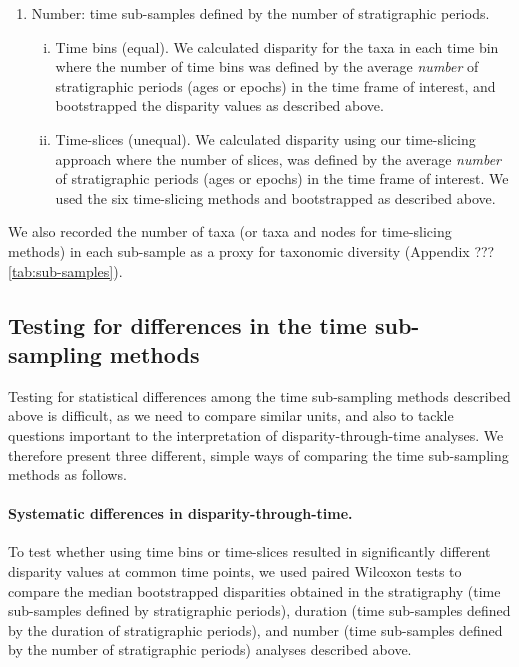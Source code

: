 \documentclass[12pt,a4paper]{article}
\begin{document}
\begin{enumerate}
  \item Number: time sub-samples defined by the number of stratigraphic periods. 
  \begin{enumerate}[(i)]
    \item Time bins (equal). 
    We calculated disparity for the taxa in each time bin where the number of time bins was defined by the average \textit{number} of stratigraphic periods (ages or epochs) in the time frame of interest, and bootstrapped the disparity values as described above.
    \item Time-slices (unequal).
    We calculated disparity using our time-slicing approach where the number of slices, was defined by the average \textit{number} of stratigraphic periods (ages or epochs) in the time frame of interest.
    We used the six time-slicing methods and bootstrapped as described above.
  \end{enumerate}


\end{enumerate}

We also recorded the number of taxa (or taxa and nodes for time-slicing methods) in each sub-sample as a proxy for taxonomic diversity (Appendix ??? \ref{tab:sub-samples}). %

\subsection{Testing for differences in the time sub-sampling methods}
\label{testing}
Testing for statistical differences among the time sub-sampling methods described above is difficult, as we need to compare similar units, and also to tackle questions important to the interpretation of disparity-through-time analyses. 
We therefore present three different, simple ways of comparing the time sub-sampling methods as follows.

\paragraph{Systematic differences in disparity-through-time.} 
To test whether using time bins or time-slices resulted in significantly different disparity values at common time points, we used paired Wilcoxon tests to compare the median bootstrapped disparities obtained in the stratigraphy (time sub-samples defined by stratigraphic periods), duration (time sub-samples defined by the duration of stratigraphic periods), and number (time sub-samples defined by the number of stratigraphic periods) analyses described above.
\end{document}
